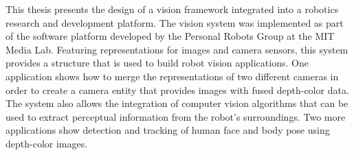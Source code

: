 

This thesis presents the design of a vision framework integrated into a robotics research and development 
platform. The vision system was implemented as part of the software platform developed by the Personal 
Robots Group at the MIT Media Lab. Featuring representations for images and camera sensors, this system 
provides a structure that is used to build robot vision applications. One application shows how to merge the 
representations of two different cameras in order to create a camera entity that provides images with fused 
depth-color data. The system also allows the integration of computer vision algorithms that can be used
to extract perceptual information from the robot's surroundings. Two more applications show detection and 
tracking of human face and body pose using depth-color images.